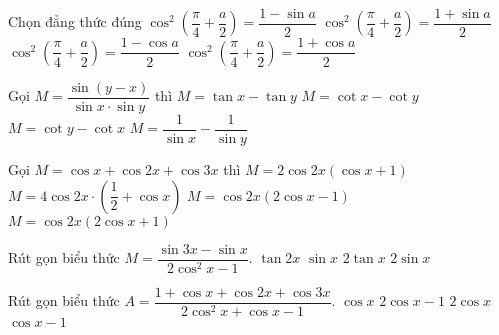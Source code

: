 \begin{ex}%
Chọn đẳng thức đúng
\choice
{\True $\cos ^2\left({\dfrac{\pi}{4}+\dfrac{a}{2}}\right)=\dfrac{{1-\sin a}}{2}$}
{$\cos ^2\left({\dfrac{\pi}{4}+\dfrac{a}{2}}\right)=\dfrac{{1+\sin a}}{2}$}
{$\cos ^2\left({\dfrac{\pi}{4}+\dfrac{a}{2}}\right)=\dfrac{{1-\cos a}}{2}$}
{$\cos ^2\left({\dfrac{\pi}{4}+\dfrac{a}{2}}\right)=\dfrac{{1+\cos a}}{2}$}

 \end{ex}

\begin{ex}%
Gọi $M=\dfrac{{\sin \left({y-x}\right)}}{{\sin x\cdot\sin y}}$ thì
\choice
{$M=\tan x-\tan y$}
{\True $M=\cot x-\cot y$}
{$M=\cot y-\cot x$}
{$M=\dfrac{1}{{\sin x}}-\dfrac{1}{{\sin y}}$}
\end{ex}

\begin{ex}%
Gọi $M=\cos x+\cos 2x+\cos 3x$ thì
\choice
{$M=2\cos 2x\left({\cos x+1}\right)$}
{$M=4\cos 2x\cdot\left({\dfrac{1}{2}+\cos x}\right)$}
{$M=\cos 2x\left({2\cos x-1}\right)$}
{\True $M=\cos 2x\left({2\cos x+1}\right)$}
\end{ex}

\begin{ex}%
Rút gọn biểu thức $M=\dfrac{{\sin 3x-\sin x}}{{2{\cos}^2x-1}}$. 
\choice
{$\tan 2x$}
{$\sin x$}
{$2\tan x$}
{\True $2\sin x$}
\end{ex}

\begin{ex}%
Rút gọn biểu thức $A=\dfrac{{1+\cos x+\cos 2x+\cos 3x}}{{2{\cos}^2x+\cos x-1}}$.
\choice
{$\cos x$}
{$2\cos x-1$}
{\True $2\cos x$}
{$\cos x-1$}
\end{ex}

